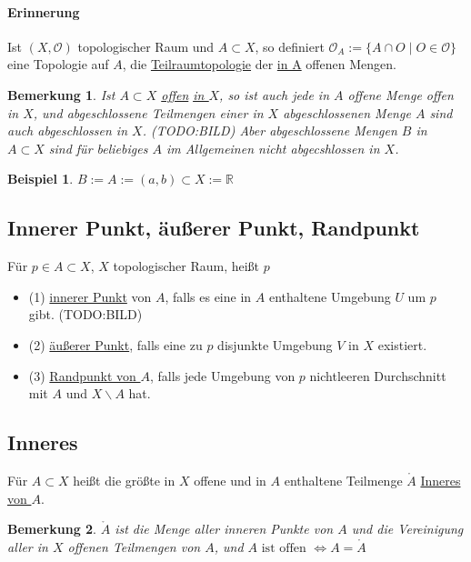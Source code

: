 \documentclass[a4paper,11pt,notitlepage]{report}
\newtheorem{remark}{Bemerkung}[chapter]
\newtheorem{example}{Beispiel}[chapter]
\newcommand{\R}{{\ensuremath{\mathbb{R}}}}
\newcommand{\OO}{{\ensuremath{\mathcal{O}}}}
\newenvironment{Kasten}[1]
{
\hspace{0.05\linewidth}
\begin{center}
\begin{minipage}{0.9\linewidth}
\setlength{\fboxsep}{18pt}
\definecolor{shadecolor}{gray}{0.9}
\definecolor{framecolor}{gray}{0}
\def\FrameCommand{\fcolorbox{framecolor}{shadecolor}}
\MakeFramed {\FrameRestore}
\subsection{#1}
\begin{itshape}
}
{
\end{itshape}
\endMakeFramed
\end{minipage}
\end{center}
\vspace{1em}
}
\begin{document}
\paragraph{Erinnerung}
Ist $(X, \OO)$ topologischer Raum und $A \subset X$, so definiert
$\OO_A := \{ A \cap O \mid O \in \OO \}$ eine Topologie auf $A$, die
 \underline{Teilraumtopologie} der \underline{in A} offenen Mengen.
 
\begin{remark}
	Ist $A \subset X$ \underline{offen} \underline{\underline{in $X$}}, so ist auch jede in $A$ offene Menge offen in $X$, und abgeschlossene Teilmengen einer in $X$ abgeschlossenen Menge $A$ sind auch abgeschlossen in $X$.
	\newline
	(TODO:BILD)
	\newline
	Aber abgeschlossene Mengen $B$ in $A \subset X$ sind für beliebiges $A$ im Allgemeinen nicht abgecshlossen in $X$.
\end{remark}

\begin{example}
	$B := A := (a,b) \subset X := \R$
\end{example}

\begin{Kasten}{Innerer Punkt, äußerer Punkt, Randpunkt}
	Für $p \in A \subset X$, $X$ topologischer Raum, heißt $p$
	\newline
	\begin{itemize}
		\item (1) \underline{innerer Punkt} von $A$, falls es eine in $A$ enthaltene Umgebung $U$ um $p$ gibt. (TODO:BILD)
		\item (2) \underline{äußerer Punkt}, falls eine zu $p$ disjunkte Umgebung $V$ in $X$ existiert.
		\item (3) \underline{Randpunkt von $A$}, falls jede Umgebung von $p$ nichtleeren Durchschnitt mit $A$ und $X \backslash A$ hat.
	\end{itemize}
\end{Kasten}

\begin{Kasten}{Inneres}
	Für $A \subset X$ heißt die größte in $X$ offene und in $A$ enthaltene Teilmenge $\mathring A$ \underline{Inneres von $A$}.
\end{Kasten}

\begin{remark}
	$\mathring A$ ist die Menge aller inneren Punkte von $A$ und die Vereinigung aller in $X$ offenen Teilmengen von $A$, und $A \text{ ist offen } \Leftrightarrow A = \mathring A$
\end{remark}
\end{document}
